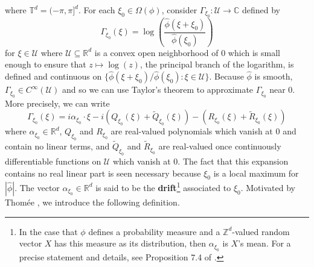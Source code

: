 \documentclass[11pt, letter]{book}
\begin{document}
where $\mathbb{T}^d=(-\pi,\pi]^d$. For each $\xi_0\in \Omega(\phi)$, consider $\Gamma_{\xi_0}:\mathcal{U}\to\mathbb{C}$ defined by
\begin{equation*}\Gamma_{\xi_0}(\xi)=\log\left(\frac{\widehat{\phi}(\xi+\xi_0)}{\widehat{\phi}(\xi_0)}\right)
\end{equation*}
for $\xi\in \mathcal{U}$ where $\mathcal{U}\subseteq\mathbb{R}^d$ is a convex open neighborhood of $0$ which is small enough to ensure that $z\mapsto\log(z)$, the principal branch of the logarithm, is defined and continuous on $\{\widehat{\phi}(\xi+\xi_0)/\widehat{\phi}(\xi_0):\xi\in\mathcal{U}\}$. Because $\widehat{\phi}$ is smooth, $\Gamma_{\xi_0}\in C^{\infty}(\mathcal{U})$ and so we can use Taylor's theorem to approximate $\Gamma_{\xi_0}$ near $0$. More precisely, we can write
\begin{equation}\label{eq:GammaExpansion}
    \Gamma_{\xi_0}(\xi)=i\alpha_{\xi_0}\cdot\xi -i\left(Q_{\xi_0}(\xi)+\widetilde{Q}_{\xi_0}(\xi)\right)-\left(R_{\xi_0}(\xi)+\widetilde{R}_{\xi_0}(\xi)\right)
\end{equation}
where $\alpha_{\xi_0}\in\mathbb{R}^d$, $Q_{\xi_0}$ and $R_{\xi_0}$ are real-valued polynomials which vanish at $0$ and contain no linear terms, and $\widetilde{Q}_{\xi_0}$ and $\widetilde{R}_{\xi_0}$ are real-valued once continuously differentiable functions on $\mathcal{U}$ which vanish at $0$. The fact that this expansion contains no real linear part is seen necessary because $\xi_0$ is a local maximum for $|\widehat{\phi}|$. The vector $\alpha_{\xi_0}\in\mathbb{R}^d$ is said to be the \textbf{drift}\footnote{In the case that $\phi$ defines a probability measure and a $\mathbb{Z}^d$-valued random vector $X$ has this measure as its distribution, then $\alpha_{\xi_0}$ is $X$'s mean. For a precise statement and details, see Proposition 7.4 of \cite{randles_convolution_2017}.} associated to $\xi_0$. Motivated by Thom\'{e}e \cite{thomee_stability_1965}, we introduce the following definition. 
\end{document}
